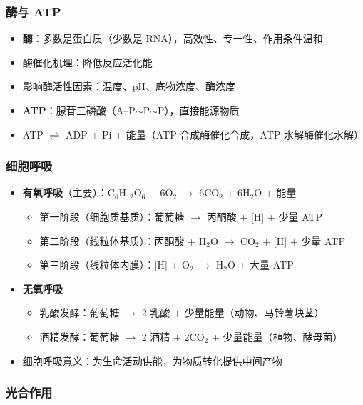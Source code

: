 \subsubsection{酶与 ATP}

\begin{itemize}
  \item \textbf{酶}：多数是蛋白质（少数是 RNA），高效性、专一性、作用条件温和
  \item 酶催化机理：降低反应活化能
  \item 影响酶活性因素：温度、pH、底物浓度、酶浓度
  \item \textbf{ATP}：腺苷三磷酸（A--P$\sim$P$\sim$P），直接能源物质
  \item ATP $\rightleftharpoons$ ADP + Pi + 能量（ATP 合成酶催化合成，ATP 水解酶催化水解）
\end{itemize}

\subsubsection{细胞呼吸}

\begin{itemize}
  \item \textbf{有氧呼吸}（主要）：C$_6$H$_{12}$O$_6$ + 6O$_2$ $\to$ 6CO$_2$ + 6H$_2$O + 能量
  \begin{itemize}
    \item 第一阶段（细胞质基质）：葡萄糖 $\to$ 丙酮酸 + [H] + 少量 ATP
    \item 第二阶段（线粒体基质）：丙酮酸 + H$_2$O $\to$ CO$_2$ + [H] + 少量 ATP
    \item 第三阶段（线粒体内膜）：[H] + O$_2$ $\to$ H$_2$O + 大量 ATP
  \end{itemize}
  \item \textbf{无氧呼吸}
  \begin{itemize}
    \item 乳酸发酵：葡萄糖 $\to$ 2 乳酸 + 少量能量（动物、马铃薯块茎）
    \item 酒精发酵：葡萄糖 $\to$ 2 酒精 + 2CO$_2$ + 少量能量（植物、酵母菌）
  \end{itemize}
  \item 细胞呼吸意义：为生命活动供能，为物质转化提供中间产物
\end{itemize}

\subsubsection{光合作用}

